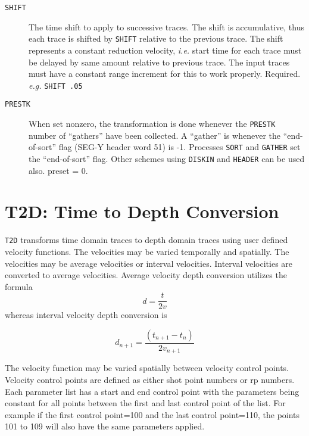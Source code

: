 \begin{description}
\item[\texttt{SHIFT}] The time shift to apply to successive traces.  The shift is
         accumulative, thus each trace is shifted by \texttt{SHIFT} relative to
         the previous trace.  The shift represents a constant reduction
         velocity, \textit{i.e.} start time for each trace must be delayed by
         same amount relative to previous trace.  The input traces must
         have a constant range increment for this to work properly.
         Required.              \textit{e.g.}  \texttt{SHIFT .05}

\item[\texttt{PRESTK}] When set nonzero, the transformation is done whenever the
         \texttt{PRESTK} number of ``\glspl{gather}'' have been collected.  A ``\gls{gather}'' is
         whenever the ``end-of-sort'' flag (SEG-Y header word 51) is -1.
         Processes \texttt{SORT} and \texttt{GATHER} set the ``end-of-sort'' flag.
         Other schemes using \texttt{DISKIN} and \texttt{HEADER} can be used also.
         \Gls{preset} = 0.
\end{description}

\section{T2D: Time to Depth Conversion}
\label{cmd_t2d}

\texttt{T2D} transforms time domain traces to depth domain traces using user
defined velocity functions.  The velocities may be varied temporally and
spatially.  The velocities may be average velocities or interval
velocities.  Interval velocities are converted to average velocities.
Average velocity depth conversion utilizes the formula
\begin{equation}
    d = \dfrac{t}{2v}
\end{equation}
whereas interval velocity depth conversion is

\begin{equation}
    d_{n+1} = \dfrac{(t_{n+1} - t_{n})}{2 v_{n+1}}
\end{equation}

The velocity function may be varied spatially between velocity control
points.  Velocity control points are defined as either \gls{shot} point numbers
or \gls{rp} numbers. Each parameter list has a start and end control point with
the parameters being constant for all points between the first and last
control point of the list.  For example if the first control point=100
and the last control point=110, the points 101 to 109 will also have the
same parameters applied.

